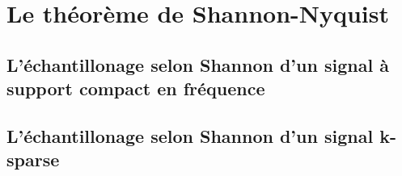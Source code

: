 \section{Le théorème de Shannon-Nyquist}
\subsection{L'échantillonage selon Shannon d'un signal à support compact en fréquence}
\subsection{L'échantillonage selon Shannon d'un signal k-sparse}

